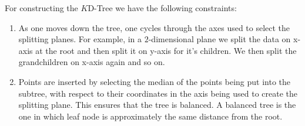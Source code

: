 \begin{algorithm}[H]
    \SetAlgoLined
\end{algorithm}

For constructing the $K$D-Tree we have the following constraints:


\begin{enumerate}
    \item {As one moves down the tree, one cycles through the axes used to select the splitting planes. For example, in a $2$-dimensional plane we split the data on x-axis at the root and then split it on y-axis for it's children. We then split the grandchildren on x-axis again and so on.}
    \item {Points are inserted by selecting the median of the points being put into the subtree, with respect to their coordinates in the axis being used to create the splitting plane. This ensures that the tree is balanced. A balanced tree is the one in which leaf node is approximately the same distance from the root.}\\
\end{enumerate}    
    
